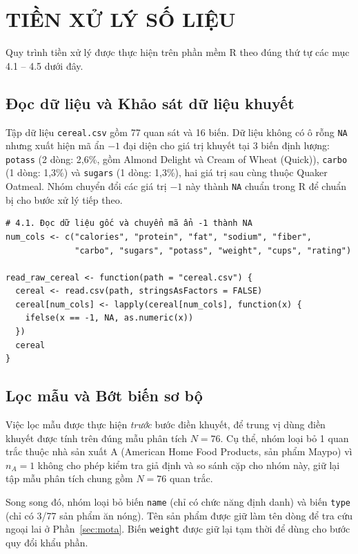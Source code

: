 \documentclass[12pt,a4paper]{article}
\begin{document}
\section{TIỀN XỬ LÝ SỐ LIỆU}

Quy trình tiền xử lý được thực hiện trên phần mềm R theo đúng thứ tự các mục 4.1 -- 4.5 dưới đây.

\subsection{Đọc dữ liệu và Khảo sát dữ liệu khuyết}

Tập dữ liệu \texttt{cereal.csv} gồm 77 quan sát và 16 biến. Dữ liệu không có ô rỗng
\texttt{NA} nhưng xuất hiện mã ẩn $-1$ đại diện cho giá trị khuyết tại 3 biến định lượng:
\texttt{potass} (2 dòng: 2,6\%, gồm Almond Delight và Cream of Wheat (Quick)), \texttt{carbo}
(1 dòng: 1,3\%) và \texttt{sugars} (1 dòng: 1,3\%), hai giá trị sau cùng thuộc Quaker
Oatmeal. Nhóm chuyển đổi các giá trị $-1$ này thành \texttt{NA} chuẩn trong R để chuẩn bị cho
bước xử lý tiếp theo.

\begin{lstlisting}
# 4.1. Đọc dữ liệu gốc và chuyển mã ẩn -1 thành NA
num_cols <- c("calories", "protein", "fat", "sodium", "fiber",
              "carbo", "sugars", "potass", "weight", "cups", "rating")

read_raw_cereal <- function(path = "cereal.csv") {
  cereal <- read.csv(path, stringsAsFactors = FALSE)
  cereal[num_cols] <- lapply(cereal[num_cols], function(x) {
    ifelse(x == -1, NA, as.numeric(x))
  })
  cereal
}
\end{lstlisting}

\subsection{Lọc mẫu và Bớt biến sơ bộ}

Việc lọc mẫu được thực hiện \emph{trước} bước điền khuyết, để trung vị dùng điền khuyết được
tính trên đúng mẫu phân tích $N = 76$. Cụ thể, nhóm loại bỏ 1 quan trắc thuộc nhà sản xuất A (American Home Food
Products, sản phẩm Maypo) vì $n_A = 1$ không cho phép kiểm tra giả định và so sánh cặp cho
nhóm này, giữ lại tập mẫu phân tích chung gồm $N = 76$ quan trắc.

Song song đó, nhóm loại bỏ biến \texttt{name} (chỉ có chức năng định danh) và
biến \texttt{type} (chỉ có 3/77 sản phẩm ăn nóng). Tên sản phẩm được giữ làm tên dòng để tra
cứu ngoại lai ở Phần~\ref{sec:mota}. Biến \texttt{weight} được giữ lại tạm thời để dùng cho
bước quy đổi khẩu phần.
\end{document}
